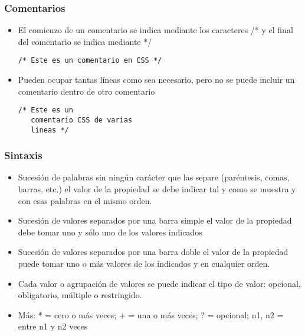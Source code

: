 
\begin{frame}[fragile]
\frametitle{Comentarios}

\begin{itemize}
  \item El comienzo de un comentario se indica mediante los caracteres /* y el final del comentario se indica mediante */
    \begin{verbatim}
/* Este es un comentario en CSS */
    \end{verbatim}
  \item Pueden ocupar tantas líneas como sea necesario, pero no se puede incluir un comentario dentro de otro comentario
    \begin{verbatim}
/* Este es un
   comentario CSS de varias
   lineas */
    \end{verbatim}
\end{itemize}

\end{frame}


\begin{frame}
\frametitle{Sintaxis}

\begin{itemize}
  \item Sucesión de palabras sin ningún carácter que las separe (paréntesis, comas, barras, etc.) el valor de la propiedad se debe indicar tal y como se muestra y con esas palabras en el mismo orden.
  \item Sucesión de valores separados por una barra simple el valor de la propiedad debe tomar uno y sólo uno de los valores indicados
  \item Sucesión de valores separados por una barra doble el valor de la propiedad puede tomar uno o más valores de los indicados y en cualquier orden.
  \item Cada valor o agrupación de valores se puede indicar el tipo de valor: opcional, obligatorio, múltiple o restringido.
  \item Más: * = cero o más veces; + = una o más veces; ? = opcional; {n1, n2} = entre n1 y n2 veces
\end{itemize}

\end{frame}




